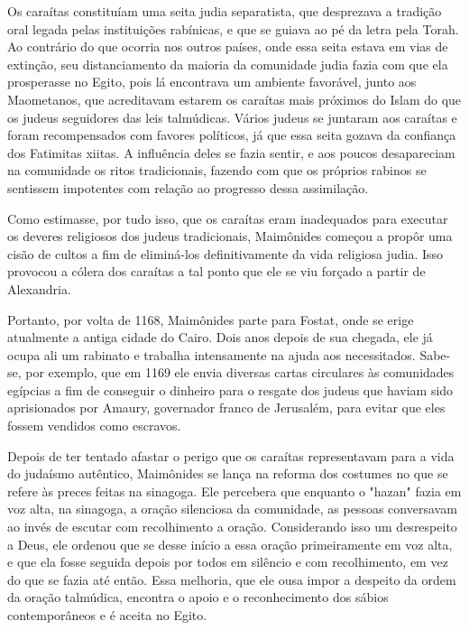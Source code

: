 \begin{itemize}
\begin{enumrate}
Os caraítas constituíam uma seita judia separatista, que desprezava a
tradição oral legada pelas instituições rabínicas, e que se guiava ao pé
da letra pela Torah. Ao contrário do que ocorria nos outros países, onde
essa seita esta­va em vias de extinção, seu distanciamento da maioria da
comunidade judia fazia 
com que ela prosperasse no Egito, pois lá encontrava um ambiente
favo­rável, junto aos Maometanos, que acreditavam estarem os caraítas
mais próxi­mos do Islam do que os judeus seguidores das leis talmúdicas.
Vários judeus se juntaram aos caraítas e foram recompensados com favores
políticos, já que essa seita gozava da confiança dos Fatimitas xiitas. A
influência deles se fazia sentir, e aos poucos desapareciam na
comunidade os ritos tradicionais, fazen­do com que os próprios rabinos
se sentissem impotentes com relação ao pro­gresso dessa assimilação.

Como estimasse, por tudo isso, que os caraítas eram inadequados para
executar os deveres religiosos dos judeus tradicionais, Maimônides
come­çou a propôr uma cisão de cultos a fim de eliminá-los
definitivamente da vida religiosa judia. Isso provocou a cólera dos
caraítas a tal ponto que ele se viu forçado a partir de Alexandria.

Portanto, por volta de 1168, Maimônides parte para Fostat, onde se erige
atualmente a antiga cidade do Cairo. Dois anos depois de sua chegada,
ele já ocupa ali um rabinato e trabalha intensamente na ajuda aos
necessitados. Sabe-se, por exemplo, que em 1169 ele envia diversas
cartas circulares às co­munidades egípcias a fim de conseguir o dinheiro
para o resgate dos judeus que haviam sido aprisionados por Amaury,
governador franco de Jerusalém, para evitar que eles fossem vendidos
como escravos.

Depois de ter tentado afastar o perigo que os caraítas representavam
para a vida do judaísmo autêntico, Maimônides se lança na reforma dos
costu­mes no que se refere às preces feitas na sinagoga. Ele percebera
que enquanto o "hazan" fazia em voz alta, na sinagoga, a oração
silenciosa da comunidade, as pessoas conversavam ao invés de escutar com
recolhimento a oração. Con­siderando isso um desrespeito a Deus, ele
ordenou que se desse início a essa oração primeiramente em voz alta, e
que ela fosse seguida depois por todos em silêncio e com recolhimento,
em vez do que se fazia até então. Essa melho­ria, que ele ousa impor a
despeito da ordem da oração talmúdica, encontra o apoio e o
reconhecimento dos sábios contemporâneos e é aceita no Egito.


\end{enumrate}
\end{itemize}
